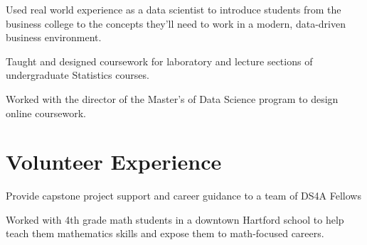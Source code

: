 \documentclass[letterpaper]{deedy-resume} %
\begin{document}
\begin{minipage}[t]{0.9\textwidth}

  \hfill{}
  \hfill
  \begin{tightitemize}
  \item Used real world experience as a data scientist to introduce
    students from the business college to the concepts they'll need to
    work in a modern, data-driven  business environment.
  \end{tightitemize}
  \sectionspace %


  \hfill{}
  \hfill{}
  \begin{tightitemize}
  \item Taught and designed coursework for laboratory and
    lecture sections of undergraduate Statistics courses.
  \item Worked with the director of the Master's of Data Science program
    to design online coursework.
  \end{tightitemize}

  \sectionspace
  \sectionspace
  
  \section{Volunteer Experience}
  \hfill{}
  \hfill
  \begin{tightitemize}
  \item  Provide capstone project support and career guidance to a team of DS4A Fellows
  \end{tightitemize}

  \sectionspace
  
  \hfill{}
  \hfill
  \begin{tightitemize}
  \item  Worked with 4th grade math students in a downtown Hartford
    school to help teach them mathematics skills and expose them to
    math-focused careers. 
  \end{tightitemize}

\end{minipage}
\end{document}
